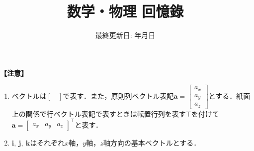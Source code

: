 \documentclass[
	report, paper=a4, head_space=23mm, foot_space=13mm,
	fontsize=8pt, jafontsize=8pt,
	gutter=20mm, line_length=170mm,
	fleqn, twoside
]{jlreq}
\makeatletter
\newcommand*{\themonth}{\two@digits\month}
\newcommand*{\theday}{\two@digits\day}
\renewcommand{\today}{{\the\year}年{\themonth}月{\theday}日}
\makeatother
\begin{document}
\title{\fontsize{40pt}{1\zh} 数学・物理 回憶錄}
\date{\LARGE 最終更新日: \today}
\maketitle

\setcounter{tocdepth}{1}
\begin{multicols}{2}
\tableofcontents
	
\end{multicols}



\noindent
\textbf{【注意】}
\begin{enumerate}[leftmargin=15pt]
	\item ベクトルは$[\quad]$で表す．また，原則列ベクトル表記$\bm{a} =
		\begin{bmatrix}
			a_x\\ a_y\\ a_z
		\end{bmatrix}$とする．紙面上の関係で行ベクトル表記で表すときは転置行列を表す$\top$を付けて$\bm{a} =
		{
			\begin{bmatrix}
			a_x & a_y & a_z
		\end{bmatrix}
		}^\top$と表す．
	\item $\bm{i},\ \bm{j},\ \bm{k}$はそれぞれ$x$軸，$y$軸，$z$軸方向の基本ベクトルとする．
\end{enumerate}

































\end{document}
